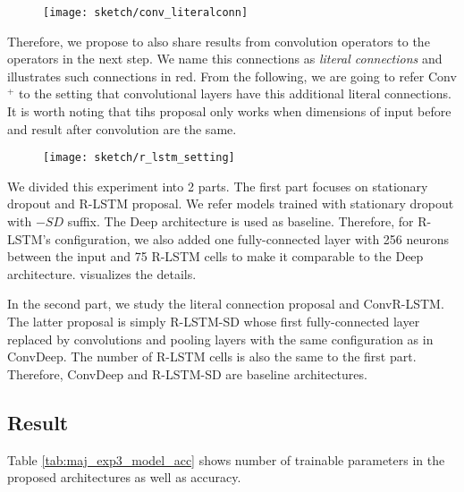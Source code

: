 

 \begin{figure}[!htb]
\centering
\texttt{[image: sketch/conv\_literalconn]}
\label{fig:conv_literalconn}
\end{figure}

Therefore, we propose to also share results from convolution operators to the operators in the next step. We name this connections as \textit{literal connections} and \addfigure{\ref{fig:conv_literalconn}} illustrates such connections in red. From the following, we are going to refer Conv$^+$ to the setting that convolutional layers have this additional literal connections.  It is worth noting that tihs proposal only works when dimensions of input before and result after convolution are the same.

\begin{figure}[!htb]
\centering
\texttt{[image: sketch/r\_lstm\_setting]}
\label{fig:rlstm_setting}
\end{figure}


We divided this experiment into 2 parts. The first part focuses on stationary dropout and R-LSTM proposal. We refer models trained with stationary dropout with $-SD$ suffix. The Deep architecture is used as baseline.  Therefore, for R-LSTM's configuration, we also added one fully-connected layer with 256 neurons between the input and 75 R-LSTM cells to make it comparable to the Deep architecture. \addfigure{\ref{fig:rlstm_setting}} visualizes the details.


In the second part, we study the literal connection proposal and ConvR-LSTM. The latter proposal is simply R-LSTM-SD whose first fully-connected layer replaced by convolutions and pooling layers with the same configuration as in ConvDeep. The number of R-LSTM cells is also the same to the first part. Therefore, ConvDeep and R-LSTM-SD are baseline architectures.

\subsection{Result}
Table \ref{tab:maj_exp3_model_acc} shows number of trainable parameters in the proposed architectures as well as accuracy.

